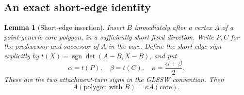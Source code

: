 \documentclass[11pt,letterpaper]{article}
\numberwithin{equation}{section}
\newtheorem{lemma}[theorem]{Lemma}
\theoremstyle{definition}
\theoremstyle{remark}
\DeclareMathOperator{\sgn}{sgn}
\begin{document}
\subsection{An exact short-edge identity}
\label{ep:short-edge-section}

\begin{lemma}[Short-edge insertion]
\label{ep:short-edge}
Insert $B$ immediately after a vertex $A$ of a point-generic core polygon,
in a sufficiently short fixed direction.  Write $P,C$ for the predecessor
and successor of $A$ in the core. Define the short-edge sign explicitly by
$t(X)=\sgn\det(A-B,X-B)$, and put
\begin{equation}
 \alpha=t(P),\quad \beta=t(C),\quad
 \kappa=\frac{\alpha+\beta}{2}.
 \label{ep:kappa}
\end{equation}
These are the two attachment-turn signs in the GLSSW convention.  Then
\begin{equation}
 A(\text{polygon with }B)=\kappa A(\text{core}).
 \label{ep:duplication}
\end{equation}
\end{lemma}
\end{document}
